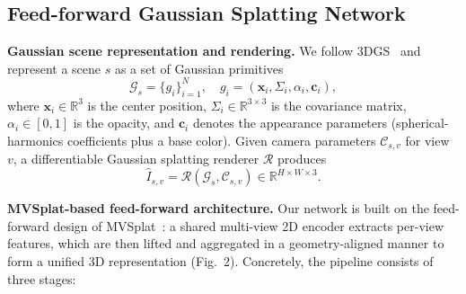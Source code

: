 \subsection{Feed-forward Gaussian Splatting Network}
\label{subsec:ff_gs_network}

\noindent \textbf{Gaussian scene representation and rendering.}
We follow 3DGS~\cite{kerbl3Dgaussians} and represent a scene \(s\) as a set of Gaussian primitives
\begin{equation}
\mathcal{G}_{s} = \{g_{i}\}_{i=1}^{N},\quad
g_{i} = (\mathbf{x}_{i}, \Sigma_{i}, \alpha_{i}, \mathbf{c}_{i}),
\end{equation}
where \(\mathbf{x}_{i} \in \mathbb{R}^{3}\) is the center position, \(\Sigma_{i} \in \mathbb{R}^{3\times 3}\) is the covariance matrix, \(\alpha_{i} \in [0,1]\) is the opacity, and \(\mathbf{c}_{i}\) denotes the appearance parameters (spherical-harmonics coefficients plus a base color).
Given camera parameters \(\mathcal{C}_{s,v}\) for view \(v\), a differentiable Gaussian splatting renderer \(\mathcal{R}\) produces
\begin{equation}
\hat{I}_{s,v} = \mathcal{R}(\mathcal{G}_{s}, \mathcal{C}_{s,v}) \in \mathbb{R}^{H\times W\times 3}.
\end{equation}

\noindent \textbf{MVSplat-based feed-forward architecture.}
Our network is built on the feed-forward design of MVSplat~\cite{chen2024mvsplat}: a shared multi-view 2D encoder extracts per-view features, which are then lifted and aggregated in a geometry-aligned manner to form a unified 3D representation (Fig.~2).
Concretely, the pipeline consists of three stages:

